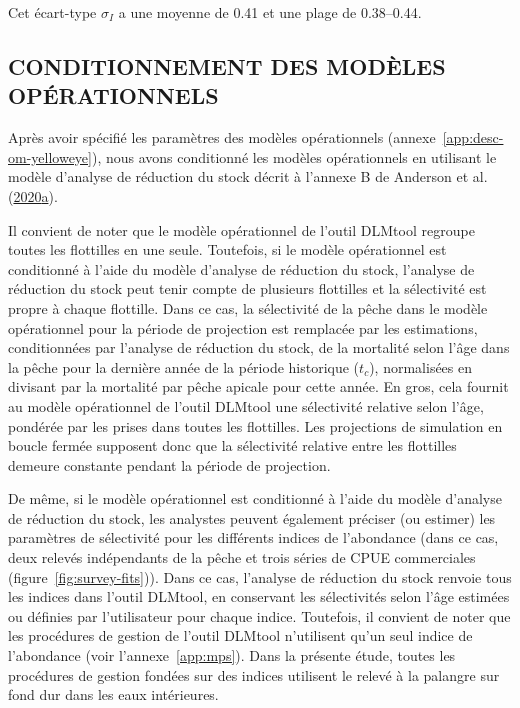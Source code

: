 \documentclass[11pt]{book}
\begin{document}
Cet écart-type \(\sigma_I\) a une moyenne de 0.41 et une plage de 0.38--0.44.

\hypertarget{sec:approach3-conditioning}{%
\subsection{CONDITIONNEMENT DES MODÈLES OPÉRATIONNELS}\label{sec:approach3-conditioning}}

Après avoir spécifié les paramètres des modèles opérationnels (annexe~\ref{app:desc-om-yelloweye}), nous avons conditionné les modèles opérationnels en utilisant le modèle d'analyse de réduction du stock décrit à l'annexe B de Anderson et al. (\protect\hyperlink{ref-anderson2020gfmp}{2020}\protect\hyperlink{ref-anderson2020gfmp}{a}).

Il convient de noter que le modèle opérationnel de l'outil DLMtool regroupe toutes les flottilles en une seule. Toutefois, si le modèle opérationnel est conditionné à l'aide du modèle d'analyse de réduction du stock, l'analyse de réduction du stock peut tenir compte de plusieurs flottilles et la sélectivité est propre à chaque flottille. Dans ce cas, la sélectivité de la pêche dans le modèle opérationnel pour la période de projection est remplacée par les estimations, conditionnées par l'analyse de réduction du stock, de la mortalité selon l'âge dans la pêche pour la dernière année de la période historique (\(t_c\)), normalisées en divisant par la mortalité par pêche apicale pour cette année. En gros, cela fournit au modèle opérationnel de l'outil DLMtool une sélectivité relative selon l'âge, pondérée par les prises dans toutes les flottilles. Les projections de simulation en boucle fermée supposent donc que la sélectivité relative entre les flottilles demeure constante pendant la période de projection.

De même, si le modèle opérationnel est conditionné à l'aide du modèle d'analyse de réduction du stock, les analystes peuvent également préciser (ou estimer) les paramètres de sélectivité pour les différents indices de l'abondance (dans ce cas, deux relevés indépendants de la pêche et trois séries de CPUE commerciales (figure~\ref{fig:survey-fits})). Dans ce cas, l'analyse de réduction du stock renvoie tous les indices dans l'outil DLMtool, en conservant les sélectivités selon l'âge estimées ou définies par l'utilisateur pour chaque indice. Toutefois, il convient de noter que les procédures de gestion de l'outil DLMtool n'utilisent qu'un seul indice de l'abondance (voir l'annexe~\ref{app:mps}). Dans la présente étude, toutes les procédures de gestion fondées sur des indices utilisent le relevé à la palangre sur fond dur dans les eaux intérieures.
\end{document}
